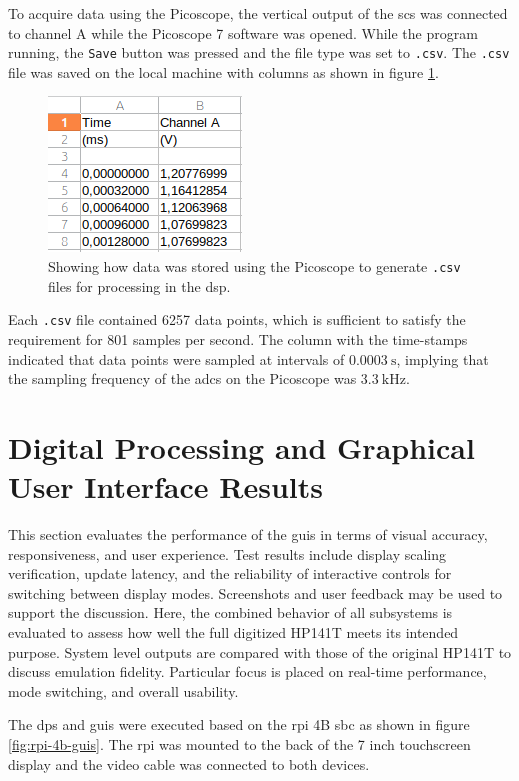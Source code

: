 \documentclass[class=report,11pt,crop=false]{standalone}
\begin{document}
	To acquire data using the Picoscope, the vertical output of the \acrshort{scs} was connected to channel A while the Picoscope 7 software was opened. While the program running, the \texttt{Save} button was pressed and the file type was set to \texttt{.csv}. The \texttt{.csv} file was saved on the local machine with columns as shown in figure \ref{fig:das-csv}. 
	
	\begin{figure}[ht!]
		\centering
		\includegraphics[width=0.35\linewidth]{Figures/Results/das-csv}
		\caption{Showing how data was stored using the Picoscope to generate \texttt{.csv} files for processing in the \acrshort{dsp}.}
		\label{fig:das-csv}
	\end{figure} 
	
	Each \texttt{.csv} file contained 6257 data points, which is sufficient to satisfy the requirement for 801 samples per second. The column with the time-stamps indicated that data points were sampled at intervals of $\SI{0.0003}{\second}$, implying that the sampling frequency of the \acrshort{adc}s on the Picoscope was $\SI{3.3}{\kilo\hertz}$. 
	 
	\section{Digital Processing and Graphical User Interface Results}
	
	This section evaluates the performance of the \acrshort{guis} in terms of visual accuracy, responsiveness, and user experience. Test results include display scaling verification, update latency, and the reliability of interactive controls for switching between display modes. Screenshots and user feedback may be used to support the discussion. Here, the combined behavior of all subsystems is evaluated to assess how well the full digitized HP141T meets its intended purpose. System level outputs are compared with those of the original HP141T to discuss emulation fidelity. Particular focus is placed on real-time performance, mode switching, and overall usability. 
	
	The \acrshort{dps} and \acrshort{guis} were executed based on the \acrshort{rpi} 4B \acrshort{sbc} as shown in figure \ref{fig:rpi-4b-guis}. The \acrshort{rpi} was mounted to the back of the 7 inch touchscreen display and the video cable was connected to both devices. 
	
\end{document}
